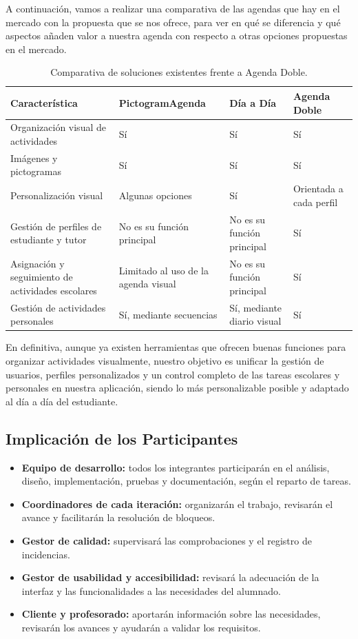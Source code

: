 A continuación, vamos a realizar una comparativa de las agendas que hay en el mercado con la propuesta que se nos ofrece, para ver en qué se diferencia y qué aspectos añaden valor a nuestra agenda con respecto a otras opciones propuestas en el mercado.

\begin{table}[H]
\centering
{}
\begin{tabularx}{\textwidth}{X p{2.8cm} p{2.8cm} p{3.2cm}}
\toprule
\rowcolor{azulPastelApagado}
\textbf{Característica} & \textbf{PictogramAgenda} & \textbf{Día a Día} & \textbf{Agenda Doble} \\
\midrule
Organización visual de actividades & Sí & Sí & Sí \\
Imágenes y pictogramas & Sí & Sí & Sí \\
Personalización visual & Algunas opciones & Sí & Orientada a cada perfil \\
Gestión de perfiles de estudiante y tutor & No es su función principal & No es su función principal & Sí \\
Asignación y seguimiento de actividades escolares & Limitado al uso de la agenda visual & No es su función principal & Sí \\
Gestión de actividades personales & Sí, mediante secuencias & Sí, mediante diario visual & Sí \\
\bottomrule
\end{tabularx}
\caption{Comparativa de soluciones existentes frente a Agenda Doble.}
\end{table}

En definitiva, aunque ya existen herramientas que ofrecen buenas funciones para organizar actividades visualmente, nuestro objetivo es unificar la gestión de usuarios, perfiles personalizados y un control completo de las tareas escolares y personales en nuestra aplicación, siendo lo más personalizable posible y adaptado al día a día del estudiante.


\subsection{Implicación de los Participantes}
\begin{itemize}
    \item \textbf{Equipo de desarrollo:} todos los integrantes participarán en el análisis, diseño, implementación, pruebas y documentación, según el reparto de tareas.
    \item \textbf{Coordinadores de cada iteración:} organizarán el trabajo, revisarán el avance y facilitarán la resolución de bloqueos.
    \item \textbf{Gestor de calidad:} supervisará las comprobaciones y el registro de incidencias.
    \item \textbf{Gestor de usabilidad y accesibilidad:} revisará la adecuación de la interfaz y las funcionalidades a las necesidades del alumnado.
    \item \textbf{Cliente y profesorado:} aportarán información sobre las necesidades, revisarán los avances y ayudarán a validar los requisitos.
\end{itemize}

